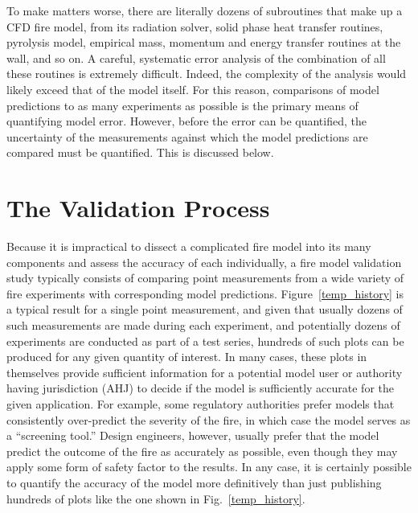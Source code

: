 To make matters worse, there are literally dozens of subroutines that make up a CFD fire model, from its radiation solver, solid phase heat transfer routines, pyrolysis model,
empirical mass, momentum and energy transfer routines at the wall, and so on. A careful, systematic error analysis of the combination of all these routines is
extremely difficult. Indeed, the complexity of the analysis would likely exceed that of the model itself. For this reason, comparisons of model predictions to as many
experiments as possible is the primary means of quantifying model error. However, before the error can be quantified, the uncertainty of the
measurements against which the model predictions are compared must be quantified. This is discussed below.


\section{The Validation Process}

Because it is impractical to dissect a complicated fire model into its many components and assess the accuracy of each individually,
a fire model validation study typically consists of comparing point measurements from a wide variety of fire experiments with corresponding model predictions.
Figure~\ref{temp_history} is a typical result for a single point measurement, and given that usually dozens of such measurements are made during each experiment,
and potentially dozens of experiments are conducted as part of a test series, hundreds of such plots can be produced for any given quantity of interest. In many cases, these
plots in themselves provide sufficient information for a potential model user or authority having jurisdiction (AHJ) to decide if the model is sufficiently accurate for the
given application. For example, some regulatory
authorities prefer models that consistently over-predict the severity of the fire, in which case the model serves as a ``screening tool.'' Design engineers, however,
usually prefer that the model predict the outcome of the fire as accurately as possible, even though they may apply some form of safety factor to the results.
In any case, it is certainly possible to quantify the accuracy of the model more definitively than just publishing
hundreds of plots like the one shown in Fig.~\ref{temp_history}.

